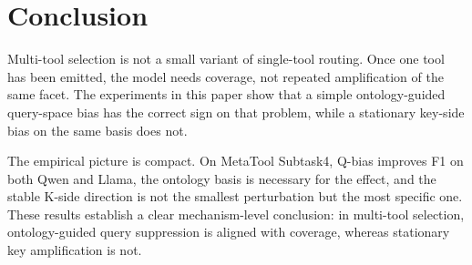 \section{Conclusion}

Multi-tool selection is not a small variant of single-tool routing. Once one tool has been emitted, the model needs coverage, not repeated amplification of the same facet. The experiments in this paper show that a simple ontology-guided query-space bias has the correct sign on that problem, while a stationary key-side bias on the same basis does not.

The empirical picture is compact. On MetaTool Subtask4, Q-bias improves F1 on both Qwen and Llama, the ontology basis is necessary for the effect, and the stable K-side direction is not the smallest perturbation but the most specific one. These results establish a clear mechanism-level conclusion: in multi-tool selection, ontology-guided query suppression is aligned with coverage, whereas stationary key amplification is not.
